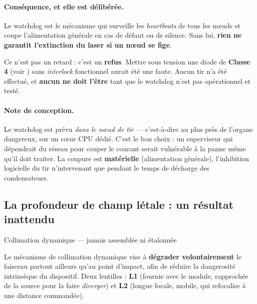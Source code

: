 \documentclass[11pt,a4paper]{article}
\begin{document}
\paragraph{Conséquence, et elle est délibérée.} Le watchdog est le mécanisme qui surveille
les \emph{heartbeats} de tous les n\oe uds et coupe l'alimentation générale en cas de
défaut ou de silence. Sans lui, \textbf{rien ne garantit l'extinction du laser si un n\oe ud
se fige}.

\begin{avertissement}
Ce n'est pas un retard : c'est un \textbf{refus}. Mettre sous tension une diode de
\textbf{Classe 4} (voir ) sans \emph{interlock}
fonctionnel aurait été une faute. Aucun tir n'a été effectué, et \textbf{aucun ne doit
l'être} tant que le watchdog n'est pas opérationnel et testé.
\end{avertissement}

\paragraph{Note de conception.} Le watchdog est prévu \emph{dans le n\oe ud de tir} —
c'est-à-dire au plus près de l'organe dangereux, sur un c\oe ur CPU dédié. C'est le bon
choix : un superviseur qui dépendrait du réseau pour couper le courant serait vulnérable à
la panne même qu'il doit traiter. La coupure est \textbf{matérielle} (alimentation
générale), l'inhibition logicielle du tir n'intervenant que pendant le temps de décharge des
condensateurs.

\subsection{La profondeur de champ létale : un résultat inattendu}

\begin{verroureporte}{Collimation dynamique — jamais assemblée ni étalonnée}
\end{verroureporte}

Le mécanisme de collimation dynamique vise à \textbf{dégrader volontairement} le faisceau
partout ailleurs qu'au point d'impact, afin de réduire la dangerosité intrinsèque du
dispositif. Deux lentilles : \textbf{L1} (fournie avec le module, rapprochée de la source
pour la faire \emph{diverger}) et \textbf{L2} (longue focale, mobile, qui refocalise à une
distance commandée).
\end{document}
